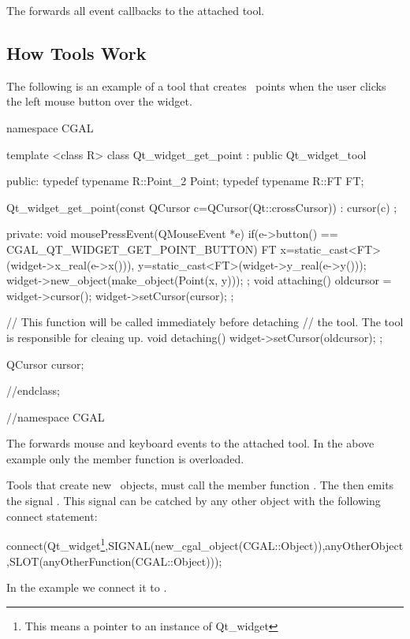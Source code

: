 
The  forwards all event callbacks to the attached tool.


\subsection{How Tools Work}

The following is an example of a tool that creates \cgal\ points when the user 
clicks the left mouse button over the widget. 
 
\begin{ccExampleCode}
namespace CGAL {

template <class R>
class Qt_widget_get_point : public Qt_widget_tool
{
public:
  typedef typename R::Point_2   Point;
  typedef typename R::FT        FT;
  
  Qt_widget_get_point(const QCursor c=QCursor(Qt::crossCursor)) :
    cursor(c) {};
  
private:
  void mousePressEvent(QMouseEvent *e)
  {
    if(e->button() == CGAL_QT_WIDGET_GET_POINT_BUTTON)
    {
      FT
        x=static_cast<FT>(widget->x_real(e->x())),
        y=static_cast<FT>(widget->y_real(e->y()));
      widget->new_object(make_object(Point(x, y)));
    }
  };
  void attaching()
  {
    oldcursor = widget->cursor();
    widget->setCursor(cursor);
  };
  
  // This function will be called immediately before detaching
  // the tool. The tool is responsible for cleaing up.
  void detaching()
  {
    widget->setCursor(oldcursor);
  };

  QCursor cursor;
}//endclass;
}//namespace CGAL
\end{ccExampleCode}

The  forwards mouse and keyboard events to the attached tool.
In the above example only the  member function is overloaded.

Tools that create new \cgal\ objects, must call the member 
function . The  
then emits the signal . This signal can be 
catched by any other object with the following connect statement:


connect(Qt\_widget\footnote{This means a pointer to an instance of Qt\_widget},SIGNAL(new\_cgal\_object(CGAL::Object)),anyOtherObject,SLOT(anyOtherFunction(CGAL::Object)));


In the example we connect it to .

